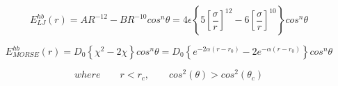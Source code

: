 


$$
E^{hb}_{LJ}(r)=AR^{-12}-BR^{-10}cos^n\theta=4\epsilon\left\lbrace 5\left[ \frac{\sigma}{r}\right]^{12}-6\left[ \frac{\sigma}{r}\right]^{10}  \right\rbrace cos^n\theta
$$

$$
E^{hb}_{MORSE}(r)=D_0\left\lbrace \chi^2 - 2\chi\right\rbrace cos^n\theta=D_{0}\left\lbrace e^{- 2 \alpha (r - r_0)} - 2 e^{- \alpha (r - r_0)} \right\rbrace cos^n\theta
$$

$$
where \qquad r < r_c, \qquad cos^2\left( \theta\right) >  cos^2\left( \theta_c\right)
$$

